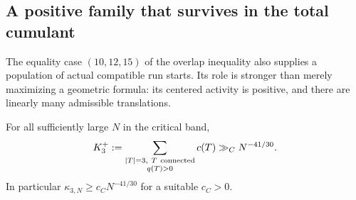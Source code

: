 \subsection{A positive family that survives in the total cumulant}

The equality case $(10,12,15)$ of the overlap inequality also supplies
a population of actual compatible run starts.  Its role is stronger
than merely maximizing a geometric formula: its centered activity is
positive, and there are linearly many admissible translations.

\begin{proposition}
\label{p13:third:lower}
For all sufficiently large $N$ in the critical band,
\begin{equation}
 K_3^+:=\sum_{\substack{|T|=3,\ T\ {\rm connected}\\q(T)>0}}c(T)
                  \gg_C N^{-41/30}.
 \label{p13:third:K3-lower}
\end{equation}
In particular $\kappa_{3,N}\geq c_C N^{-41/30}$ for a suitable
$c_C>0$.
\end{proposition}

